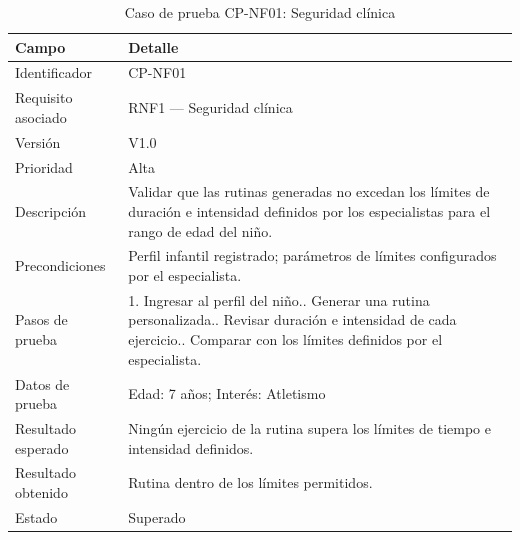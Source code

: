 				\begin{table}[H]
					\centering\small
					\caption{Caso de prueba CP-NF01: Seguridad clínica}
					\label{tab:cpnf01}
					\begin{tabular}{p{3cm}p{12.0cm}}
						\hline
						\textbf{Campo} & \textbf{Detalle}\\
						\hline
						Identificador & CP-NF01\\
						Requisito asociado & RNF1 --- Seguridad clínica\\
						Versión & V1.0\\
						Prioridad & Alta\\
						Descripción & Validar que las rutinas generadas no excedan los límites de duración e intensidad definidos por los especialistas para el rango de edad del niño.\\
						Precondiciones & Perfil infantil registrado; parámetros de límites configurados por el especialista.\\
						Pasos de prueba & 1. Ingresar al perfil del niño.\newline 2. Generar una rutina personalizada.\newline 3. Revisar duración e intensidad de cada ejercicio.\newline 4. Comparar con los límites definidos por el especialista.\\
						Datos de prueba & Edad: 7 años; Interés: Atletismo\\
						Resultado esperado & Ningún ejercicio de la rutina supera los límites de tiempo e intensidad definidos.\\
						Resultado obtenido & Rutina dentro de los límites permitidos.\\
						Estado & Superado\\
						\hline
					\end{tabular}
				\end{table}
				\tblnote
				
